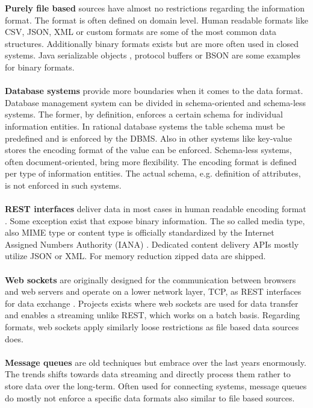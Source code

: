 \noindent\textbf{Purely file based} sources have almost no restrictions regarding the information format. The format is often defined on domain level. Human readable formats like CSV, JSON, XML or custom formats are some of the most common data structures. Additionally binary formats exists but are more often used in closed systems. Java serializable objects \cite{serializable_objects_2017}, protocol buffers \cite{protocol_buffers_2017} or BSON \cite{bson_2017} are some examples for binary formats.
\\\\
\textbf{Database systems} provide more boundaries when it comes to the data format. Database management system can be divided in schema-oriented and schema-less systems. The former, by definition, enforces a certain schema for individual information entities. In rational database systems the table schema must be predefined and is enforced by the DBMS. Also in other systems like key-value stores the encoding format of the value can be enforced. Schema-less systems, often document-oriented, bring more flexibility. The encoding format is defined per type of information entities. The actual schema, e.g. definition of attributes, is not enforced in such systems.
\\\\
\textbf{REST interfaces} deliver data in most cases in human readable encoding format \cite{rest_2017}. Some exception exist that expose binary information. The so called media type, also MIME type or content type is officially standardized by the Internet Assigned Numbers Authority (IANA) \cite{media_types_2017}. Dedicated content delivery APIs mostly utilize JSON or XML. For memory reduction zipped data are shipped. 
\\\\
\textbf{Web sockets} are originally designed for the communication between browsers and web servers and operate on a lower network layer, TCP, as REST interfaces for data exchange \cite{websocket_2017}. Projects exists where web sockets are used for data transfer and enables a streaming unlike REST, which works on a batch basis. Regarding formats, web sockets apply similarly loose restrictions as file based data sources does.
\\\\
\textbf{Message queues} are old techniques but embrace over the last years enormously. The trends shifts towards data streaming and directly process them rather to store data over the long-term. Often used for connecting systems, message queues do mostly not enforce a specific data formats also similar to file based sources.


